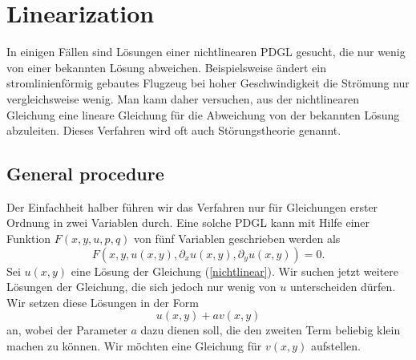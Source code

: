 %
%
%
\section{Linearization}
In einigen Fällen sind Lösungen einer nichtlinearen PDGL gesucht, die 
nur wenig von einer bekannten Lösung abweichen. Beispielsweise ändert
ein stromlinienförmig gebautes Flugzeug bei hoher Geschwindigkeit die
Strömung nur vergleichsweise wenig. Man kann daher versuchen, aus der
nichtlinearen Gleichung eine lineare Gleichung für die Abweichung
von der bekannten Lösung abzuleiten. Dieses Verfahren wird oft auch
Störungstheorie genannt.

\subsection{General procedure}
Der Einfachheit halber führen wir das Verfahren nur für Gleichungen
erster Ordnung in zwei Variablen durch. Eine solche PDGL kann mit Hilfe
einer Funktion $F(x,y,u,p,q)$ von fünf Variablen geschrieben werden als
\begin{equation}
F(x,y,u(x,y), \partial_xu(x,y),\partial_yu(x,y))=0.
\label{nichtlinear}
\end{equation}
Sei $u(x,y)$ eine Lösung der Gleichung (\ref{nichtlinear}). Wir suchen
jetzt weitere Lösungen der Gleichung, die sich jedoch nur wenig von
$u$ unterscheiden dürfen. Wir setzen diese Lösungen in der Form
\begin{equation}
u(x,y)+av(x,y)
\label{linearisierungansatz}
\end{equation}
an, wobei der Parameter $a$ dazu dienen soll, die den
zweiten Term beliebig klein machen zu können. Wir möchten eine Gleichung
für $v(x,y)$ aufstellen.

